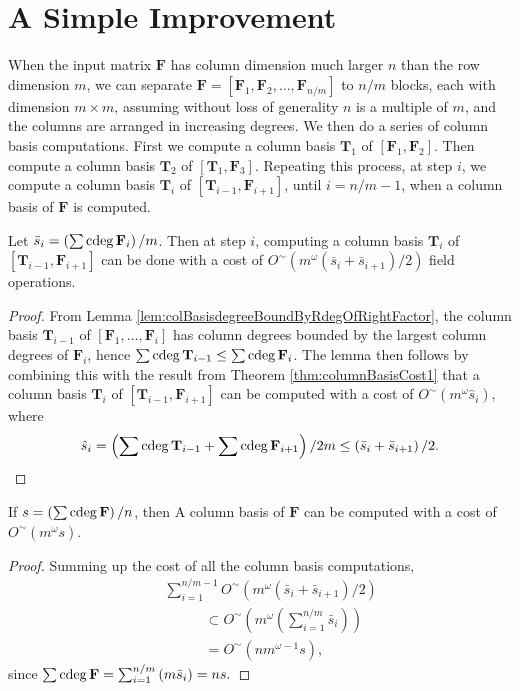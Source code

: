 
\section{\label{sec:successiveColBasisComputation}A Simple Improvement}

When the input matrix $\mathbf{F}$ has column dimension much larger
$n$ than the row dimension $m$, we can separate $\mathbf{F}=\left[\mathbf{F}_{1},\mathbf{F}_{2},\dots,\mathbf{F}_{n/m}\right]$
to $n/m$ blocks, each with dimension $m\times m$, assuming without
loss of generality $n$ is a multiple of $m$, and the columns are
arranged in increasing degrees. We then do a series of column basis
computations. First we compute a column basis $\mathbf{T}_{1}$ of
$\left[\mathbf{F}_{1},\mathbf{F}_{2}\right]$. Then compute a column
basis $\mathbf{T}_{2}$ of $\left[\mathbf{T}_{1},\mathbf{F}_{3}\right]$.
Repeating this process, at step $i$, we compute a column basis $\mathbf{T}_{i}$
of $\left[\mathbf{T}_{i-1},\mathbf{F}_{i+1}\right]$, until $i=n/m-1$,
when a column basis of $\mathbf{F}$ is computed. 
\begin{lem}
Let $\bar{s}_{i}=\left(\sum{\rm cdeg}\,\mathbf{F}_{i}\right)/m$. Then at
step $i$, computing a column basis $\mathbf{T}_{i}$ of $\left[\mathbf{T}_{i-1},\mathbf{F}_{i+1}\right]$
can be done with a cost of $O^{\sim}\left(m^{\omega}(\bar{s}_{i}+\bar{s}_{i+1})/2\right)$
field operations.\end{lem}
\begin{proof}
From Lemma \ref{lem:colBasisdegreeBoundByRdegOfRightFactor}, the
column basis $\mathbf{T}_{i-1}$ of $\left[\mathbf{F}_{1},\dots,\mathbf{F}_{i}\right]$
has column degrees bounded by the largest column degrees of $\mathbf{F}_{i}$,
hence $\sum{\rm cdeg}\,\mathbf{T}_{i-1}\le\sum{\rm cdeg}\,\mathbf{F}_{i}$. The
lemma then follows by combining this with the result from Theorem
\ref{thm:columnBasisCost1} that a column basis $\mathbf{T}_{i}$
of $\left[\mathbf{T}_{i-1},\mathbf{F}_{i+1}\right]$ can be computed
with a cost of $O^{\sim}\left(m^{\omega}\hat{s}_{i}\right)$, where
\[
\hat{s}_{i}=\left(\sum{\rm cdeg}\,\mathbf{T}_{i-1}+\sum{\rm cdeg}\,\mathbf{F}_{i+1}\right)/2m\le\left(\bar{s}_{i}+\bar{s}_{i+1}\right)/2.
\]
 \end{proof}
\begin{thm}
If $s=\left(\sum{\rm cdeg}\,\mathbf{F}\right)/n$, then \label{thm:finalCollBasisCost}A
column basis of $\mathbf{F}$ can be computed with a cost of $O^{\sim}\left(m^{\omega}s\right)$. \end{thm}
\begin{proof}
Summing up the cost of all the column basis computations, 
\begin{eqnarray*}
 &  & \sum_{i=1}^{n/m-1}O^{\sim}\left(m^{\omega}\left(\bar{s}_{i}+\bar{s}_{i+1}\right)/2\right)\\
 &  & ~~~~~~~~~~~~~\subset O^{\sim}\left(m^{\omega}\left(\sum_{i=1}^{n/m}\bar{s}_{i}\right)\right)\\
 &  & ~~~~~~~~~~~~~=O^{\sim}\left(nm^{\omega-1}s\right),
\end{eqnarray*}
 since $\sum{\rm cdeg}\,\mathbf{F}=\sum_{i=1}^{n/m}\left(m\bar{s}_{i}\right)=ns.$\end{proof}
